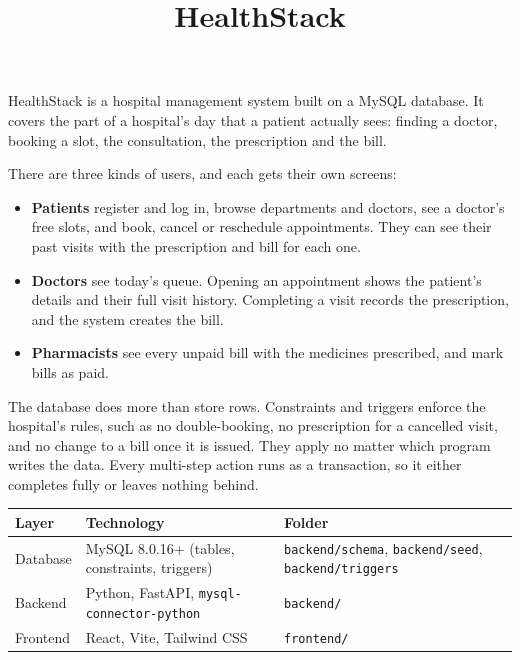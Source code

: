 \documentclass[11pt,a4paper]{article}
\title{\textbf{HealthStack}}
\author{}
\date{}
\newcommand{\code}[1]{\texttt{#1}}
\begin{document}
\maketitle
\vspace{-3em}

HealthStack is a hospital management system built on a MySQL database. It covers the part of a hospital's day that a patient actually sees: finding a doctor, booking a slot, the consultation, the prescription and the bill.

There are three kinds of users, and each gets their own screens:

\begin{itemize}
  \item \textbf{Patients} register and log in, browse departments and doctors, see a doctor's free slots, and book, cancel or reschedule appointments. They can see their past visits with the prescription and bill for each one.
  \item \textbf{Doctors} see today's queue. Opening an appointment shows the patient's details and their full visit history. Completing a visit records the prescription, and the system creates the bill.
  \item \textbf{Pharmacists} see every unpaid bill with the medicines prescribed, and mark bills as paid.
\end{itemize}

The database does more than store rows. Constraints and triggers enforce the hospital's rules, such as no double-booking, no prescription for a cancelled visit, and no change to a bill once it is issued. They apply no matter which program writes the data. Every multi-step action runs as a transaction, so it either completes fully or leaves nothing behind.

\begin{center}
\small
\begin{tabularx}{\textwidth}{l L L}
\toprule
\textbf{Layer} & \textbf{Technology} & \textbf{Folder} \\
\midrule
Database & MySQL 8.0.16+ (tables, constraints, triggers) & \code{backend/schema}, \code{backend/seed}, \code{backend/triggers} \\
Backend  & Python, FastAPI, \code{mysql-connector-python} & \code{backend/} \\
Frontend & React, Vite, Tailwind CSS & \code{frontend/} \\
\bottomrule
\end{tabularx}
\end{center}
\end{document}
